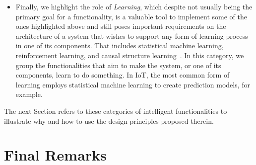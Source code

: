\begin{itemize}
    \item Finally, we highlight the role of \emph{Learning}, which despite not usually being the primary goal for a functionality, is a valuable tool to implement some of the ones highlighted above and still poses important requirements on the architecture of a system that wishes to support any form of learning process in one of its components.
    That includes statistical machine learning, reinforcement learning, and causal structure learning~\cite{Bordini2020-AI,Erduran2023,Mariani2023a,Mariani2023}. 
    In this category, we group the functionalities that aim to make the system, or one of its components, learn to do something. 
    In IoT, the most common form of learning employs statistical machine learning to create prediction models, for example. 
\end{itemize}
%
The next Section refers to these categories of intelligent functionalities to illustrate why and how to use the design principles proposed therein.



\section{Final Remarks}

